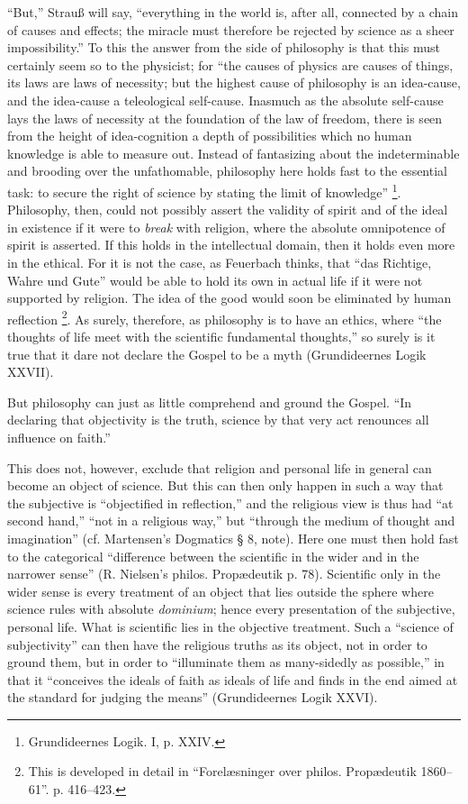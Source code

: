 \documentclass[12pt,a4paper]{book}
\newcommand{\opage}[1]{\marginnote{\footnotesize\textit{[#1]}}}
\begin{document}
``But,'' Strauß will say, ``everything in the world is, after all, connected
by a chain of causes and effects; the miracle must therefore be
rejected by science as a sheer impossibility.'' To this the
answer from the side of philosophy is that this must certainly
seem so to the physicist; for ``the causes of physics are causes of things,
its laws are laws of necessity; but the highest cause of philosophy
is an idea-cause, and the idea-cause a teleological
self-cause. Inasmuch as the absolute self-cause lays the laws of necessity
at the foundation of the law of freedom, there is seen from the height of
idea-cognition a depth of possibilities which no human
knowledge is able to measure out. Instead of fantasizing
about the indeterminable and brooding over the unfathomable,
philosophy here holds fast to the essential task:
to secure the right of science by stating the limit of knowledge''%
\footnote{Grundideernes Logik. I, p. XXIV.}.
Philosophy, then, could not possibly assert the validity of spirit and of the
ideal in existence if it were to \emph{break} with
religion, where the absolute omnipotence of spirit is asserted. If this holds
in the intellectual domain, then it holds even more
in the ethical. For it is not the case, as Feuerbach
thinks, that ``das Richtige, Wahre und Gute'' would be able to hold
its own in actual life if it were not supported by religion.
The idea of the good would soon be eliminated by human
\opage{40}\setcounter{footnote}{0}%
reflection%
\footnote{This is developed in detail in ``Forelæsninger over philos. Propædeutik
1860--61''. p. 416--423.}. As surely, therefore, as philosophy is to
have an ethics, where ``the thoughts of life meet with the scientific
fundamental thoughts,'' so surely is it true that it dare not declare the Gospel
to be a myth (Grundideernes Logik XXVII).

But philosophy can just as little comprehend and ground the Gospel.
``In declaring that objectivity is
the truth, science by that very act renounces all influence
on faith.''

This does not, however, exclude that religion and
personal life in general can become an object of science.
But this can then only happen in such a way that the subjective
is ``objectified in reflection,'' and the religious view is thus
had ``at second hand,'' ``not in a religious way,'' but
``through the medium of thought and imagination'' (cf. Martensen's
Dogmatics § 8, note). Here one must then hold fast to the
categorical ``difference between the scientific in the wider and in the narrower sense''
(R. Nielsen's philos. Propædeutik p. 78).
Scientific only in the wider sense is every treatment of
an object that lies outside the sphere where science
rules with absolute \textit{dominium}; hence every presentation
of the subjective, personal life. What is scientific
lies in the objective treatment. Such a ``science of subjectivity''
can then have the religious truths as its object,
not in order to ground them, but in order to ``illuminate them as many-sidedly
as possible,'' in that it ``conceives the ideals of faith as ideals of life
and finds in the end aimed at the standard for judging
the means'' (Grundideernes Logik XXVI).
\end{document}
